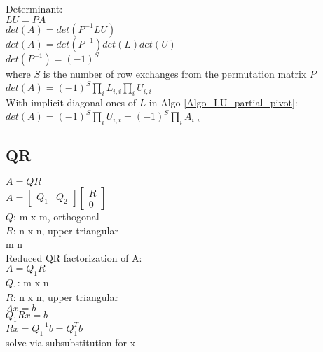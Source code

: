 \documentclass[8pt,letter]{article}
\begin{document}
\begin{multicols*}{2}
    Determinant:\\
    
    $LU=PA$\\
    $det(A) = det(P^{-1} LU)$\\
    $det(A) = det(P^{-1}) det(L) det(U)$\\
    $det(P^{-1}) = (-1)^S$\\
    where $S$ is the number of row exchanges from the permutation matrix $P$\\
    $det(A) = (-1)^S \prod_i L_{i,i} \prod_i U_{i,i}$\\
    With implicit diagonal ones of $L$ in Algo \ref{Algo_LU_partial_pivot}:\\
    $det(A) = (-1)^S \prod_i U_{i,i} = (-1)^S \prod_i A_{i,i}$\\
    
    \vfill\null
    \pagebreak
    
    \subsection{QR}
    $A = QR$\\
    $A = \begin{bmatrix} Q_1 &Q_2 \end{bmatrix} \begin{bmatrix} R\\0 \end{bmatrix}$\\
    $Q$: m x m, orthogonal\\
    $R$: n x n, upper triangular\\
    m \geq n\\

    Reduced QR factorization of A:\\
    $A = Q_1 R$\\
    $Q_1$: m x n\\
    $R$: n x n, upper triangular\\

    $Ax = b$\\
    $Q_1 R x = b$\\
    $Rx = Q_1^{-1} b = Q_1^T b$\\
    solve via subsubstitution for x\\


\end{multicols*}
\end{document}
